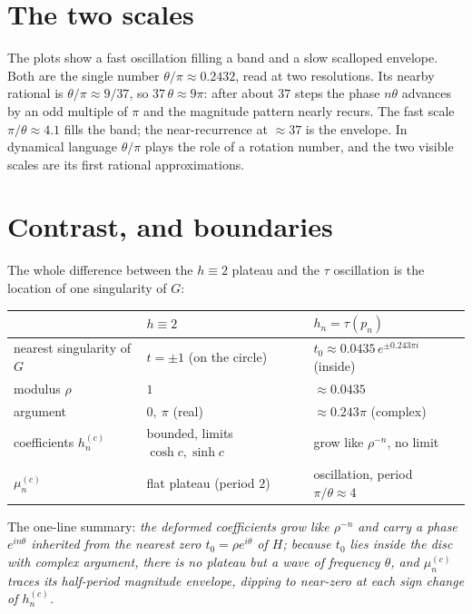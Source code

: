 \documentclass[11pt, fleqn]{amsart}
\theoremstyle{remark}
\begin{document}
\section{The two scales}\label{sec:scales}

The plots show a fast oscillation filling a band and a slow scalloped envelope. Both are the
single number $\theta/\pi\approx0.2432$, read at two resolutions. Its nearby rational is
$\theta/\pi\approx 9/37$, so $37\,\theta\approx 9\pi$: after about $37$ steps the phase
$n\theta$ advances by an odd multiple of $\pi$ and the magnitude pattern nearly recurs. The
fast scale $\pi/\theta\approx4.1$ fills the band; the near-recurrence at $\approx37$ is the
envelope. In dynamical language $\theta/\pi$ plays the role of a rotation number, and the
two visible scales are its first rational approximations.

\section{Contrast, and boundaries}\label{sec:boundaries}

The whole difference between the $h\equiv2$ plateau and the $\tau$ oscillation is the
location of one singularity of $G$:
\begin{center}
\begin{tabular}{lll}
\toprule
 & $h\equiv2$ & $h_n=\tau(p_n)$\\
\midrule
nearest singularity of $G$ & $t=\pm1$ (on the circle) & $t_0\approx0.0435\,e^{\pm0.243\pi i}$ (inside)\\
modulus $\rho$ & $1$ & $\approx0.0435$\\
argument & $0,\ \pi$ (real) & $\approx0.243\pi$ (complex)\\
coefficients $h_n^{(c)}$ & bounded, limits $\cosh c,\sinh c$ & grow like $\rho^{-n}$, no limit\\
$\mu_n^{(c)}$ & flat plateau (period $2$) & oscillation, period $\pi/\theta\approx4$\\
\bottomrule
\end{tabular}
\end{center}

\noindent The one-line summary: \emph{the deformed coefficients grow like $\rho^{-n}$ and
carry a phase $e^{in\theta}$ inherited from the nearest zero $t_0=\rho e^{i\theta}$ of $H$;
because $t_0$ lies inside the disc with complex argument, there is no plateau but a wave of
frequency $\theta$, and $\mu_n^{(c)}$ traces its half-period magnitude envelope, dipping to
near-zero at each sign change of $h_n^{(c)}$.}
\end{document}
